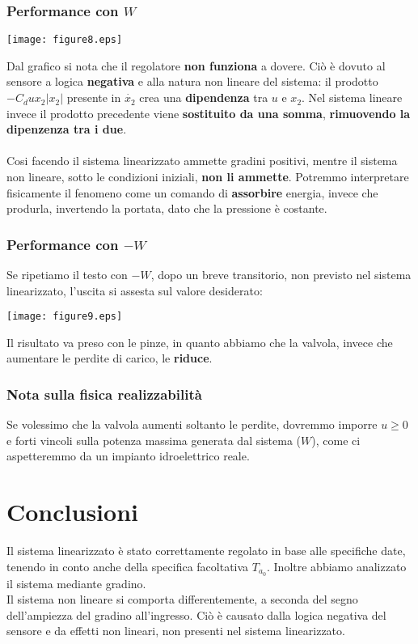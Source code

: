 \documentclass{article}
\begin{document}
\subsubsection{Performance con $W$}

\begin{center}
    \texttt{[image: figure8.eps]}
\end{center}

Dal grafico si nota che il regolatore \textbf{non funziona} a dovere. Ciò è dovuto al sensore a logica \textbf{negativa} e alla natura non lineare del sistema: il prodotto $-C_d u x_2 |x_2|$ presente in $\dot{x_2}$ crea una \textbf{dipendenza} tra $u$ e $x_2$. Nel sistema lineare invece il prodotto precedente viene \textbf{sostituito da una somma}, \textbf{rimuovendo la dipenzenza tra i due}.\\\\
Cosi facendo il sistema linearizzato ammette gradini positivi, mentre il sistema non lineare, sotto le condizioni iniziali, \textbf{non li ammette}. Potremmo interpretare fisicamente il fenomeno come un comando di \textbf{assorbire} energia, invece che produrla, invertendo la portata, dato che la pressione è costante.

\newpage

\subsubsection{Performance con $-W$}

Se ripetiamo il testo con $-W$, dopo un breve transitorio, non previsto nel sistema linearizzato, l'uscita si assesta sul valore desiderato:

\begin{center}
    \texttt{[image: figure9.eps]}
\end{center}

Il risultato va preso con le pinze, in quanto abbiamo che la valvola, invece che aumentare le perdite di carico, le \textbf{riduce}.

\subsubsection{Nota sulla fisica realizzabilità}
Se volessimo che la valvola aumenti soltanto le perdite, dovremmo imporre $u\geq0$ e forti vincoli sulla potenza massima generata dal sistema ($W$), come ci aspetteremmo da un impianto idroelettrico reale.

\section{Conclusioni}

Il sistema linearizzato è stato correttamente regolato in base alle specifiche date, tenendo in conto anche della specifica facoltativa $T_{a_0}$. Inoltre abbiamo analizzato il sistema mediante gradino.\\

Il sistema non lineare si comporta differentemente, a seconda del segno dell'ampiezza del gradino all'ingresso. Ciò è causato dalla logica negativa del sensore e da effetti non lineari, non presenti nel sistema linearizzato.
\end{document}
